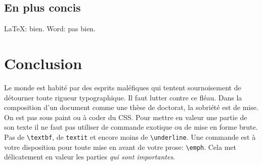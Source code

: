     \subsection{En plus concis}
        \LaTeX: bien. Word: pas bien.
        
\section{Conclusion}
    Le monde est habité par des esprits maléfiques qui tentent sournoisement de détourner toute rigueur typographique.
    Il faut lutter contre ce fléau.
    Dans la composition d'un document comme une thèse de doctorat, la sobriété est de mise.
    On est pas sous paint ou à coder du CSS.
    Pour mettre en valeur une partie de son texte il ne faut pas utiliser de commande exotique ou de mise en forme brute.
    Pas de \verb|\textbf|, de \verb|textit| et encore moins de \verb|\underline|.
    Une commande est à votre disposition pour toute mise en avant de votre prose: \verb|\emph|.
    Cela met délicatement en valeur les parties \emph{qui sont importantes}.
